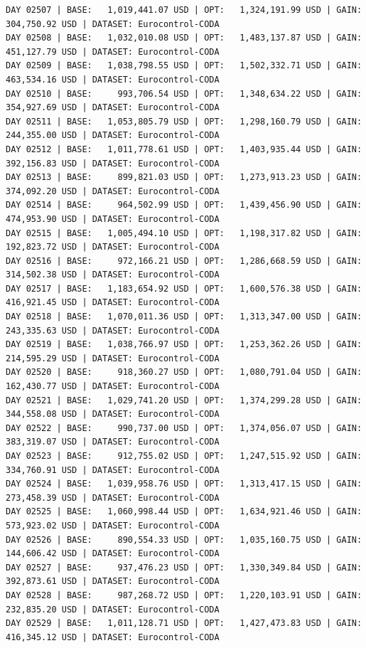 \documentclass[11pt,a4paper]{article}
\begin{document}
\begin{verbatim}
DAY 02507 | BASE:   1,019,441.07 USD | OPT:   1,324,191.99 USD | GAIN: 304,750.92 USD | DATASET: Eurocontrol-CODA
DAY 02508 | BASE:   1,032,010.08 USD | OPT:   1,483,137.87 USD | GAIN: 451,127.79 USD | DATASET: Eurocontrol-CODA
DAY 02509 | BASE:   1,038,798.55 USD | OPT:   1,502,332.71 USD | GAIN: 463,534.16 USD | DATASET: Eurocontrol-CODA
DAY 02510 | BASE:     993,706.54 USD | OPT:   1,348,634.22 USD | GAIN: 354,927.69 USD | DATASET: Eurocontrol-CODA
DAY 02511 | BASE:   1,053,805.79 USD | OPT:   1,298,160.79 USD | GAIN: 244,355.00 USD | DATASET: Eurocontrol-CODA
DAY 02512 | BASE:   1,011,778.61 USD | OPT:   1,403,935.44 USD | GAIN: 392,156.83 USD | DATASET: Eurocontrol-CODA
DAY 02513 | BASE:     899,821.03 USD | OPT:   1,273,913.23 USD | GAIN: 374,092.20 USD | DATASET: Eurocontrol-CODA
DAY 02514 | BASE:     964,502.99 USD | OPT:   1,439,456.90 USD | GAIN: 474,953.90 USD | DATASET: Eurocontrol-CODA
DAY 02515 | BASE:   1,005,494.10 USD | OPT:   1,198,317.82 USD | GAIN: 192,823.72 USD | DATASET: Eurocontrol-CODA
DAY 02516 | BASE:     972,166.21 USD | OPT:   1,286,668.59 USD | GAIN: 314,502.38 USD | DATASET: Eurocontrol-CODA
DAY 02517 | BASE:   1,183,654.92 USD | OPT:   1,600,576.38 USD | GAIN: 416,921.45 USD | DATASET: Eurocontrol-CODA
DAY 02518 | BASE:   1,070,011.36 USD | OPT:   1,313,347.00 USD | GAIN: 243,335.63 USD | DATASET: Eurocontrol-CODA
DAY 02519 | BASE:   1,038,766.97 USD | OPT:   1,253,362.26 USD | GAIN: 214,595.29 USD | DATASET: Eurocontrol-CODA
DAY 02520 | BASE:     918,360.27 USD | OPT:   1,080,791.04 USD | GAIN: 162,430.77 USD | DATASET: Eurocontrol-CODA
DAY 02521 | BASE:   1,029,741.20 USD | OPT:   1,374,299.28 USD | GAIN: 344,558.08 USD | DATASET: Eurocontrol-CODA
DAY 02522 | BASE:     990,737.00 USD | OPT:   1,374,056.07 USD | GAIN: 383,319.07 USD | DATASET: Eurocontrol-CODA
DAY 02523 | BASE:     912,755.02 USD | OPT:   1,247,515.92 USD | GAIN: 334,760.91 USD | DATASET: Eurocontrol-CODA
DAY 02524 | BASE:   1,039,958.76 USD | OPT:   1,313,417.15 USD | GAIN: 273,458.39 USD | DATASET: Eurocontrol-CODA
DAY 02525 | BASE:   1,060,998.44 USD | OPT:   1,634,921.46 USD | GAIN: 573,923.02 USD | DATASET: Eurocontrol-CODA
DAY 02526 | BASE:     890,554.33 USD | OPT:   1,035,160.75 USD | GAIN: 144,606.42 USD | DATASET: Eurocontrol-CODA
DAY 02527 | BASE:     937,476.23 USD | OPT:   1,330,349.84 USD | GAIN: 392,873.61 USD | DATASET: Eurocontrol-CODA
DAY 02528 | BASE:     987,268.72 USD | OPT:   1,220,103.91 USD | GAIN: 232,835.20 USD | DATASET: Eurocontrol-CODA
DAY 02529 | BASE:   1,011,128.71 USD | OPT:   1,427,473.83 USD | GAIN: 416,345.12 USD | DATASET: Eurocontrol-CODA

\end{verbatim}
\end{document}

